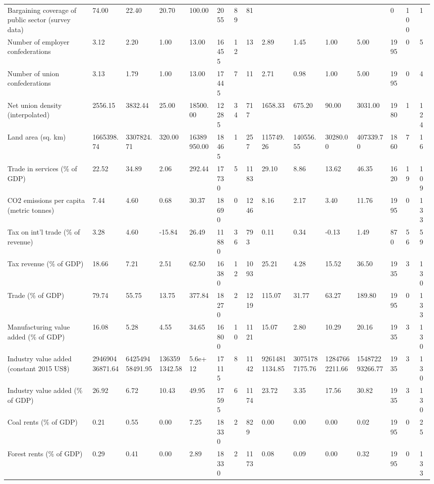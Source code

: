 \begin{longtable}{lllllllllllllll}
\addlinespace
Bargaining coverage of public sector (survey data) & 74.00 & 22.40 & 20.70 & 100.00 & 2055 & 89 & 81 &  &  &  &  & 0 & 100 & 1\\
Number of employer confederations & 3.12 & 2.20 & 1.00 & 13.00 & 16455 & 12 & 13 & 2.89 & 1.45 & 1.00 & 5.00 & 1995 & 0 & 5\\
Number of union confederations & 3.13 & 1.79 & 1.00 & 13.00 & 17445 & 7 & 11 & 2.71 & 0.98 & 1.00 & 5.00 & 1995 & 0 & 4\\
Net union density (interpolated) & 2556.15 & 3832.44 & 25.00 & 18500.00 & 12285 & 34 & 717 & 1658.33 & 675.20 & 90.00 & 3031.00 & 1980 & 1 & 124\\
Land area (sq. km) & 1665398.74 & 3307824.71 & 320.00 & 16389950.00 & 18465 & 1 & 257 & 115749.26 & 140556.55 & 30280.00 & 407339.70 & 1860 & 7 & 16\\
\addlinespace
Trade in services (\% of GDP) & 22.52 & 34.89 & 2.06 & 292.44 & 17730 & 5 & 1183 & 29.10 & 8.86 & 13.62 & 46.35 & 1620 & 19 & 109\\
CO2 emissions per capita (metric tonnes) & 7.44 & 4.60 & 0.68 & 30.37 & 18690 & 0 & 1246 & 8.16 & 2.17 & 3.40 & 11.76 & 1995 & 0 & 133\\
Tax on int'l trade (\% of revenue) & 3.28 & 4.60 & -15.84 & 26.49 & 11880 & 36 & 793 & 0.11 & 0.34 & -0.13 & 1.49 & 870 & 56 & 59\\
Tax revenue (\% of GDP) & 18.66 & 7.21 & 2.51 & 62.50 & 16380 & 12 & 1093 & 25.21 & 4.28 & 15.52 & 36.50 & 1935 & 3 & 130\\
Trade (\% of GDP) & 79.74 & 55.75 & 13.75 & 377.84 & 18270 & 2 & 1219 & 115.07 & 31.77 & 63.27 & 189.80 & 1995 & 0 & 133\\
\addlinespace
Manufacturing value added (\% of GDP) & 16.08 & 5.28 & 4.55 & 34.65 & 16800 & 10 & 1121 & 15.07 & 2.80 & 10.29 & 20.16 & 1935 & 3 & 130\\
Industry value added (constant 2015 US\$) & 294690436871.64 & 642549458491.95 & 1363591342.58 & 5.6e+12 & 17115 & 8 & 1142 & 92614811134.85 & 30751787175.76 & 12847662211.66 & 154872293266.77 & 1935 & 3 & 130\\
Industry value added (\% of GDP) & 26.92 & 6.72 & 10.43 & 49.95 & 17595 & 6 & 1174 & 23.72 & 3.35 & 17.56 & 30.82 & 1935 & 3 & 130\\
Coal rents (\% of GDP) & 0.21 & 0.55 & 0.00 & 7.25 & 18330 & 2 & 829 & 0.00 & 0.00 & 0.00 & 0.02 & 1995 & 0 & 25\\
Forest rents (\% of GDP) & 0.29 & 0.41 & 0.00 & 2.89 & 18330 & 2 & 1173 & 0.08 & 0.09 & 0.00 & 0.32 & 1995 & 0 & 133\\

\end{longtable}

